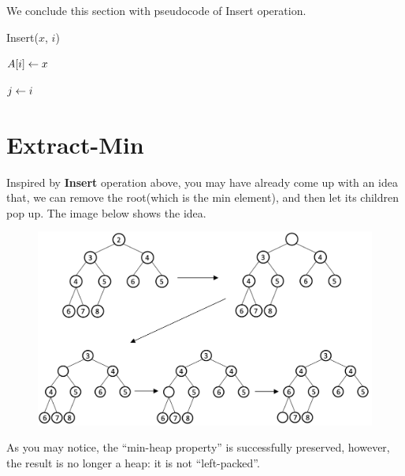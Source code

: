 \begin{spacing}{1.3}
    We conclude this section with pseudocode of Insert operation.
    \begin{algorithm*}[htbp]
        \caption{Insert($x$, $i$)}

        $A[i]\leftarrow x$

        $j\leftarrow i$

    \end{algorithm*}

    \vspace{0.3in}
    \section{Extract-Min}

    Inspired by {\bf Insert} operation above, you may have already come up with 
    an idea that, we can remove the root(which is the min element), and then let 
    its children pop up. The image below shows the idea.
    \begin{figure}[htbp]
        \centering
        \includegraphics[scale=0.32]{images/05-min-wrong.png}
    \end{figure}

    As you may notice, the ``min-heap property'' is successfully preserved, however, 
    the result is no longer a heap: it is not ``left-packed''.


\end{spacing}

